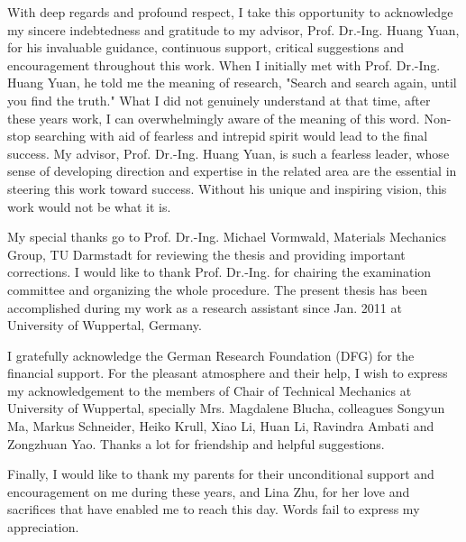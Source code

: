 

With deep regards and profound respect, I take this opportunity to acknowledge my sincere indebtedness and gratitude to my advisor, Prof. Dr.-Ing. Huang Yuan, for his invaluable guidance, continuous support, critical suggestions and encouragement throughout this work.
When I initially met with Prof. Dr.-Ing. Huang Yuan, he told me the meaning of research, "Search and search again, until you find the truth."
What I did not genuinely understand at that time, after these years work, I can overwhelmingly aware of the meaning
of this word. Non-stop searching with aid of fearless and intrepid spirit would lead to the final success.
My advisor, Prof. Dr.-Ing. Huang Yuan, is such a fearless leader, whose sense of developing direction and expertise in the related area are the essential in steering this work toward success.
Without his unique and inspiring vision, this work would not be what it is.


My special thanks go to Prof. Dr.-Ing. Michael Vormwald, Materials Mechanics Group, TU Darmstadt for reviewing the thesis and providing important corrections.
I would like to thank Prof. Dr.-Ing.  for chairing the examination committee and organizing the whole procedure.
The present thesis has been accomplished during my work as a research assistant since Jan. 2011 at University of Wuppertal, Germany.


I gratefully acknowledge the German Research Foundation (DFG) for the financial support.
For the pleasant atmosphere and their help, I wish to express my acknowledgement to the members of Chair of Technical Mechanics at University of Wuppertal, specially Mrs. Magdalene Blucha, colleagues Songyun Ma, Markus Schneider, Heiko Krull, Xiao Li, Huan Li, Ravindra Ambati and Zongzhuan Yao. Thanks a lot for friendship and helpful suggestions.


Finally, I would like to thank my parents for their unconditional support and encouragement on me during these years, and Lina Zhu, for her love and sacrifices that have enabled me to reach this day. Words fail to express my appreciation.


